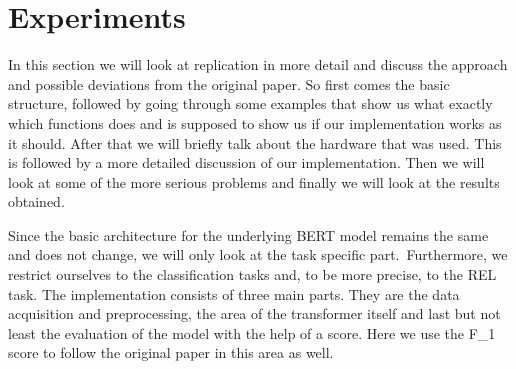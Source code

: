 \chapter{Experiments}
\label{chap:Experiments}
In this section we will look at replication in more detail and discuss the approach and possible deviations from the original paper. So first comes the basic structure, followed by going through some examples that show us what exactly which functions does and is supposed to show us if our implementation works as it should. After that we will briefly talk about the hardware that was used. This is followed by a more detailed discussion of our implementation. Then we will look at some of the more serious problems and finally we will look at the results obtained.

Since the basic architecture for the underlying BERT model remains the same and does not change, we will only look at the task specific part. Furthermore, we restrict ourselves to the classification tasks and, to be more precise, to the REL task. The implementation consists of three main parts. They are the data acquisition and preprocessing, the area of the transformer itself and last but not least the evaluation of the model with the help of a score. Here we use the F\_1 score to follow the original paper in this area as well. 

